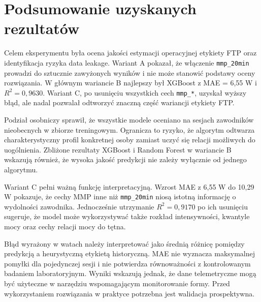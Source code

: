 \FloatBarrier
\section{Podsumowanie uzyskanych rezultatów}

Celem eksperymentu była ocena jakości estymacji operacyjnej etykiety FTP oraz identyfikacja ryzyka data leakage. Wariant A pokazał, że włączenie \texttt{mmp\_20min} prowadzi do sztucznie zawyżonych wyników i nie może stanowić podstawy oceny rozwiązania. W głównym wariancie B najlepszy był XGBoost z MAE = 6{,}55 W i $R^2 = 0{,}9630$. Wariant C, po usunięciu wszystkich cech \texttt{mmp\_*}, uzyskał wyższy błąd, ale nadal pozwalał odtworzyć znaczną część wariancji etykiety FTP.

Podział osobniczy sprawił, że wszystkie modele oceniano na sesjach zawodników nieobecnych w zbiorze treningowym. Ogranicza to ryzyko, że algorytm odtwarza charakterystyczny profil konkretnej osoby zamiast uczyć się relacji możliwych do uogólnienia. Zbliżone rezultaty XGBoost i Random Forest w wariancie B wskazują również, że wysoka jakość predykcji nie zależy wyłącznie od jednego algorytmu.

Wariant C pełni ważną funkcję interpretacyjną. Wzrost MAE z 6{,}55 W do 10{,}29 W pokazuje, że cechy MMP inne niż \texttt{mmp\_20min} niosą istotną informację o wydolności zawodnika. Jednocześnie utrzymanie $R^2 = 0{,}9170$ po ich usunięciu sugeruje, że model może wykorzystywać także rozkład intensywności, kwantyle mocy oraz cechy relacji mocy do tętna.

Błąd wyrażony w watach należy interpretować jako średnią różnicę pomiędzy predykcją a heurystyczną etykietą historyczną. MAE nie wyznacza maksymalnej pomyłki dla pojedynczej sesji i nie potwierdza równoważności z kontrolowanym badaniem laboratoryjnym. Wyniki wskazują jednak, że dane telemetryczne mogą być użyteczne w narzędziu wspomagającym monitorowanie formy. Przed wykorzystaniem rozwiązania w praktyce potrzebna jest walidacja prospektywna.
